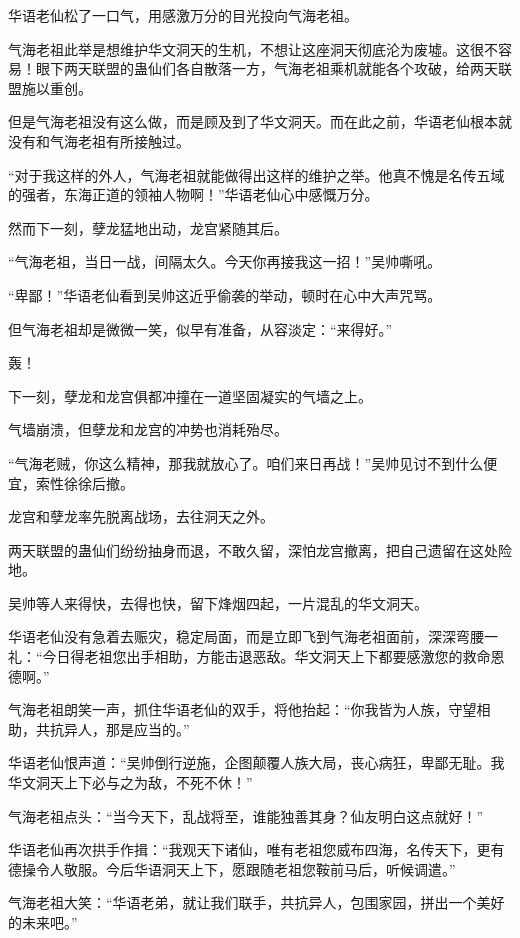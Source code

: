 \begin{this_body}
华语老仙松了一口气，用感激万分的目光投向气海老祖。

气海老祖此举是想维护华文洞天的生机，不想让这座洞天彻底沦为废墟。这很不容易！眼下两天联盟的蛊仙们各自散落一方，气海老祖乘机就能各个攻破，给两天联盟施以重创。

但是气海老祖没有这么做，而是顾及到了华文洞天。而在此之前，华语老仙根本就没有和气海老祖有所接触过。

“对于我这样的外人，气海老祖就能做得出这样的维护之举。他真不愧是名传五域的强者，东海正道的领袖人物啊！”华语老仙心中感慨万分。

然而下一刻，孽龙猛地出动，龙宫紧随其后。

“气海老祖，当日一战，间隔太久。今天你再接我这一招！”吴帅嘶吼。

“卑鄙！”华语老仙看到吴帅这近乎偷袭的举动，顿时在心中大声咒骂。

但气海老祖却是微微一笑，似早有准备，从容淡定：“来得好。”

轰！

下一刻，孽龙和龙宫俱都冲撞在一道坚固凝实的气墙之上。

气墙崩溃，但孽龙和龙宫的冲势也消耗殆尽。

“气海老贼，你这么精神，那我就放心了。咱们来日再战！”吴帅见讨不到什么便宜，索性徐徐后撤。

龙宫和孽龙率先脱离战场，去往洞天之外。

两天联盟的蛊仙们纷纷抽身而退，不敢久留，深怕龙宫撤离，把自己遗留在这处险地。

吴帅等人来得快，去得也快，留下烽烟四起，一片混乱的华文洞天。

华语老仙没有急着去赈灾，稳定局面，而是立即飞到气海老祖面前，深深弯腰一礼：“今日得老祖您出手相助，方能击退恶敌。华文洞天上下都要感激您的救命恩德啊。”

气海老祖朗笑一声，抓住华语老仙的双手，将他抬起：“你我皆为人族，守望相助，共抗异人，那是应当的。”

华语老仙恨声道：“吴帅倒行逆施，企图颠覆人族大局，丧心病狂，卑鄙无耻。我华文洞天上下必与之为敌，不死不休！”

气海老祖点头：“当今天下，乱战将至，谁能独善其身？仙友明白这点就好！”

华语老仙再次拱手作揖：“我观天下诸仙，唯有老祖您威布四海，名传天下，更有德操令人敬服。今后华语洞天上下，愿跟随老祖您鞍前马后，听候调遣。”

气海老祖大笑：“华语老弟，就让我们联手，共抗异人，包围家园，拼出一个美好的未来吧。”

\end{this_body}

